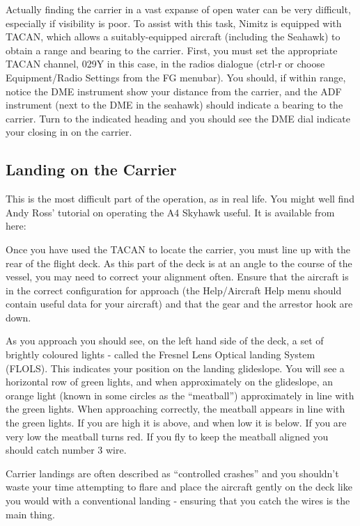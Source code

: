 Actually finding the carrier in a vast expanse of open water can be very difficult, especially if visibility
is poor. To assist with this task, Nimitz is equipped with TACAN, which allows a suitably-equipped
aircraft (including the Seahawk) to obtain a range and bearing to the carrier. First, you must set
the appropriate TACAN channel, 029Y in this case, in the radios dialogue (ctrl-r or choose
Equipment/Radio Settings from the FG menubar). You should, if within range, notice the DME instrument
show your distance from the carrier, and the ADF instrument (next to the DME in the seahawk) should
indicate a bearing to the carrier. Turn to the indicated heading and you should see the DME dial
indicate your closing in on the carrier.

\subsection{Landing on the Carrier}

This is the most difficult part of the operation, as in real life. You might well find Andy Ross' tutorial on
operating the A4 Skyhawk useful. It is available from here:

\noindent
{}

Once you have used the TACAN to locate the carrier, you must
line up with the rear of the flight deck. As this part of the deck is at an angle to the course of the vessel,
you may need to correct your alignment often. Ensure that the aircraft is in the correct configuration for
approach (the Help/Aircraft Help menu should contain useful data for your aircraft) and that the gear and
the arrestor hook are down.

As you approach you should see, on the left hand side of the deck, a set of brightly coloured lights - called
the Fresnel Lens Optical landing System (FLOLS). This indicates your position on the landing glideslope.
You will see a horizontal row of green lights, and when approximately on the glideslope, an orange light
(known in some circles as the ``meatball'') approximately in line with the green lights. When approaching
correctly, the meatball appears in line with the green lights. If you are high it is above, and when low
it is below. If you are very low the meatball turns red. If you fly to keep the meatball aligned you
should catch number 3 wire.

Carrier landings are often described as ``controlled crashes'' and you shouldn't waste your time attempting
to flare and place the aircraft gently on the deck like you would with a conventional landing - ensuring that
you catch the wires is the main thing.


